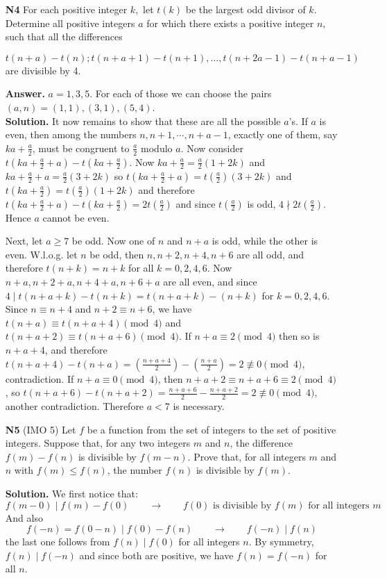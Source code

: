 \documentclass[11pt,a4paper]{article}
\begin{document}
\begin{enumerate}
	\item[\textbf{N4}] For each positive integer $k,$ let $t(k)$ be the largest odd divisor of $k.$ Determine all positive integers $a$ for which there exists a positive integer $n,$ such that all the differences
	
	\[t(n+a)-t(n); t(n+a+1)-t(n+1), \ldots, t(n+2a-1)-t(n+a-1)\] are divisible by 4.
	
	\textbf{Answer.} $a=1, 3, 5$. For each of those we can choose the pairs $(a, n)=(1, 1), (3, 1), (5,4)$. \\
	\textbf{Solution.} It now remains to show that these are all the possible $a$'s. If $a$ is even, then among the numbers $n, n+1, \cdots , n+a-1$, exactly one of them, say $ka+\frac{a}{2}$, must be congruent to $\frac{a}{2}$ modulo $a$. Now consider $t(ka+\frac{a}{2}+a)-t(ka+\frac{a}{2})$. 
	Now $ka+\frac{a}{2}=\frac{a}{2}(1+2k)$ and $ka+\frac{a}{2}+a=\frac{a}{2}(3+2k)$ so $t(ka+\frac{a}{2}+a)=t(\frac{a}{2})(3+2k)$ and $t(ka+\frac{a}{2})=t(\frac{a}{2})(1+2k)$ and therefore 
	$t(ka+\frac{a}{2}+a)-t(ka+\frac{a}{2})=2t(\frac{a}{2})$ and since $t(\frac{a}{2})$ is odd, $4\nmid 2t(\frac{a}{2})$. Hence $a$ cannot be even. 
	
	Next, let $a\ge 7$ be odd. Now one of $n$ and $n+a$ is odd, while the other is even. W.l.o.g. let $n$ be odd, then $n, n+2, n+4, n+6$ are all odd, and therefore $t(n+k)=n+k$ for all $k=0, 2, 4, 6$. 
	Now $n+a, n+2+a, n+4+a, n+6+a$ are all even, and since $4\mid t(n+a+k)-t(n+k)=t(n+a+k)-(n+k)$ for $k=0, 2, 4, 6$. Since $n\equiv n+4$ and $n+2\equiv n+6$, we have $t(n+a)\equiv t(n+a+4)\pmod{4}$ and $t(n+a+2)\equiv t(n+a+6)\pmod{4}$. If $n+a\equiv 2\pmod{4}$ then so is $n+a+4$, and therefore $t(n+a+4)-t(n+a)=(\frac{n+a+4}{2})-(\frac{n+a}{2})=2\not\equiv 0\pmod{4}$, contradiction. 
	If $n+a\equiv 0\pmod{4}$, then $n+a+2\equiv n+a+6\equiv 2\pmod{4}$, so $t(n+a+6)-t(n+a+2)=\frac{n+a+6}{2}-\frac{n+a+2}{2}=2\not\equiv 0\pmod{4}$, another contradiction. Therefore $a<7$ is necessary. 
	
	\item[\textbf{N5}] (IMO 5) Let $f$ be a function from the set of integers to the set of positive integers. Suppose that, for any two integers $m$ and $n$, the difference $f(m) - f(n)$ is divisible by $f(m- n)$. 
	Prove that, for all integers $m$ and $n$ with $f(m) \leq f(n)$, the number $f(n)$ is divisible by $f(m)$.
	
	\textbf{Solution.} We first notice that: 
	\begin{equation}
		f(m - 0)\mid f(m) - f(0)\qquad 
		\to 
		\qquad 
		\text{$f(0)$ is divisible by $f(m)$ for all integers $m$}
	\end{equation}
    And also 
    \begin{equation}
    	f(-n)=f(0-n)\mid f(0)-f(n)
    	\qquad 
    	\to 
    	\qquad f(-n)\mid f(n)
    \end{equation}
    the last one follows from $f(n)\mid f(0)$ for all integers $n$. 
    By symmetry, $f(n)\mid f(-n)$ and since both are positive, we have $f(n)=f(-n)$ for all $n$. 
    

\end{enumerate}
\end{document}
